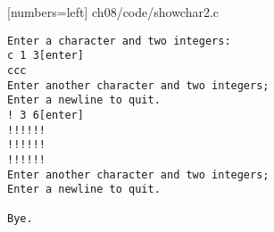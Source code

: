 \begin{frame}

[numbers=left]
{ch08/code/showchar2.c}
\end{frame}
\begin{frame}[fragile]
\begin{lstlisting}[backgroundcolor=\color{blue!20}]
Enter a character and two integers:
c 1 3[enter]
ccc
Enter another character and two integers;
Enter a newline to quit.
! 3 6[enter]
!!!!!!
!!!!!!
!!!!!!
Enter another character and two integers;
Enter a newline to quit.

Bye.
\end{lstlisting}
\end{frame}
